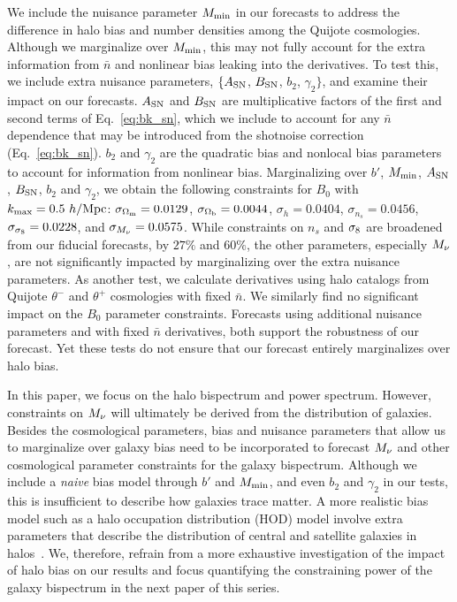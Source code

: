 We include the nuisance parameter $M_{\rm min}$ in our forecasts to address the 
difference in halo bias and number densities among the Quijote cosmologies. Although 
we marginalize over $M_{\rm min}$, this may not fully account for the extra 
information from $\bar{n}$ and nonlinear bias leaking into the derivatives. 
To test this, we include extra nuisance parameters, $\{A_{\rm SN}$, 
$B_{\rm SN}$, $b_2$, $\gamma_2\}$, and examine their impact on our forecasts. 
$A_{\rm SN}$ and $B_{\rm SN}$ are multiplicative factors of the first and
second terms of Eq.~\ref{eq:bk_sn}, which we include to account for any 
$\bar{n}$ dependence that may be introduced from the shotnoise correction 
(Eq.~\ref{eq:bk_sn}). $b_2$ and $\gamma_2$ are the quadratic bias and nonlocal bias 
parameters~\citep{chan2012, sheth2013} to account for information from 
nonlinear bias. Marginalizing over $b'$, $M_{\rm min}$, $A_{\rm SN}$, $B_{\rm SN}$, 
$b_2$ and $\gamma_2$, we obtain the following constraints for $B_0$ 
with $k_{\rm max} = 0.5~h/{\rm Mpc}$:
$\sigma_{\Omega_{\rm m}} = 0.0129$, $\sigma_{\Omega_{\rm b}} = 0.0044$, $\sigma_h=0.0404$, 
$\sigma_{n_s}=0.0456$, $\sigma_{\sigma_8}=0.0228$, and $\sigma_{M_\nu}=0.0575$. 
While constraints on $n_s$ and $\sigma_8$ are broadened from our fiducial 
forecasts, by $27\%$ and $60\%$, the other parameters, especially $M_\nu$, 
are not significantly impacted by marginalizing over the extra nuisance 
parameters. As another test, we calculate derivatives using halo catalogs 
from Quijote $\theta^{-}$ and $\theta^{+}$ cosmologies with fixed $\bar{n}$. 
We similarly find no significant impact on the $B_0$ parameter constraints.
Forecasts using additional nuisance parameters and with fixed $\bar{n}$ 
derivatives, both support the robustness of our forecast. Yet these 
tests do not ensure that our forecast entirely marginalizes over halo bias. 

In this paper, we focus on the halo bispectrum and power spectrum. However,   
constraints on $M_\nu$ will ultimately be derived from the distribution of 
galaxies. Besides the cosmological parameters, bias and nuisance parameters 
that allow us to marginalize over galaxy bias need to be incorporated to 
forecast $M_\nu$ and other cosmological parameter constraints for the 
galaxy bispectrum. Although we include a \emph{naive} bias model through $b'$ 
and $M_{\rm min}$, and even $b_2$ and $\gamma_2$ in our tests, this is 
insufficient to describe how galaxies trace matter. A more realistic bias model 
such as a halo occupation distribution (HOD) model involve extra parameters 
that describe the distribution of central and satellite galaxies in 
halos~\citep[\emph{e.g.}][]{zheng2005,leauthaud2012,tinker2013,zentner2016,vakili2019}. 
We, therefore, refrain from a more exhaustive investigation of the impact of 
halo bias on our results and focus quantifying the constraining power of 
the galaxy bispectrum in the next paper of this series. 

